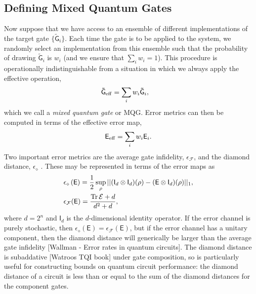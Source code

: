 \documentclass[aps,nofootinbib,pra,notitlepage,twocolumn]{revtex4-1}
\newcommand{\tr}{{\rm Tr\thinspace}}
\newcommand{\error}{\ensuremath{{\mathsf{E}}}}
\begin{document}
\subsection{Defining Mixed Quantum Gates}
\noindent Now suppose that we have access to an ensemble of different implementations of the target gate $\{\mathsf{\tilde G}_i\}$.
Each time the gate is to be applied to the system, we randomly select an implementation from this ensemble such that the probability of drawing $\mathsf{\tilde G}_i$ is $w_i$ (and we ensure that $\sum_i w_i=1$). This procedure is operationally indistinguishable from a situation in which we always apply the effective operation, 
\begin{align}
	\mathsf{\tilde G}_{\rm eff} &= \sum_i w_i \mathsf{\tilde G}_i,
\end{align}
which we call a \emph{mixed quantum gate} or MQG. Error metrics can then be computed in terms of the effective error map, 
\begin{equation}
	\mathsf{E}_{\rm eff} = \sum_i w_i \mathsf{E}_i.
\end{equation}
Two important error metrics are the average gate infidelity, $\epsilon_\mathcal{F}$, and the diamond distance, $\epsilon_\diamond$ \cite{}. These may be represented in terms of the error maps as
\begin{align}
	&\epsilon_\diamond \left(\mathsf{E}\right)
		= \frac{1}{2} \sup_\rho \vert \vert (\mathsf{I}_d\otimes \mathsf{I}_d)(\rho) 
										  - (\error \otimes \mathsf{I}_d)(\rho) \vert\vert_1,\\
	&\epsilon_\mathcal{F}(\mathsf{E}) = \frac{\tr{\mathcal{E}} + d}{d^2 + d},
\end{align}
where $d=2^n$ and $\mathsf{I}_d$ is the $d$-dimensional identity operator.  If the error channel is purely stochastic, then $\epsilon_\diamond(\error) = \epsilon_\mathcal{F}(\error)$, but if the error channel has a unitary component, then the diamond distance will generically be larger than the average gate infidelity [Wallman - Error rates in quantum circuits]. The diamond distance is subaddative [Watroos TQI book] under gate composition, so is particularly useful for constructing bounds on quantum circuit performance: the diamond distance of a circuit is less than or equal to the sum of the diamond distances for the component gates. 
\end{document}
